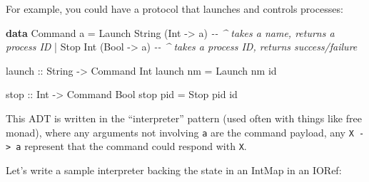 \documentclass[]{article}
\newenvironment{Shaded}{}{}
\newcommand{\CommentTok}[1]{\textcolor[rgb]{0.38,0.63,0.69}{\textit{#1}}}
\newcommand{\DataTypeTok}[1]{\textcolor[rgb]{0.56,0.13,0.00}{#1}}
\newcommand{\FunctionTok}[1]{\textcolor[rgb]{0.02,0.16,0.49}{#1}}
\newcommand{\KeywordTok}[1]{\textcolor[rgb]{0.00,0.44,0.13}{\textbf{#1}}}
\newcommand{\NormalTok}[1]{#1}
\newcommand{\OperatorTok}[1]{\textcolor[rgb]{0.40,0.40,0.40}{#1}}
\newcommand{\OtherTok}[1]{\textcolor[rgb]{0.00,0.44,0.13}{#1}}
\begin{document}
For example, you could have a protocol that launches and controls processes:

\begin{Shaded}
\begin{Highlighting}[]
\KeywordTok{data} \DataTypeTok{Command}\NormalTok{ a }\OtherTok{=}
    \DataTypeTok{Launch} \DataTypeTok{String}\NormalTok{ (}\DataTypeTok{Int} \OtherTok{{-}\textgreater{}}\NormalTok{ a)    }\CommentTok{{-}{-} \^{} takes a name, returns a process ID}
  \OperatorTok{|} \DataTypeTok{Stop} \DataTypeTok{Int}\NormalTok{ (}\DataTypeTok{Bool} \OtherTok{{-}\textgreater{}}\NormalTok{ a)        }\CommentTok{{-}{-} \^{} takes a process ID, returns success/failure}

\OtherTok{launch ::} \DataTypeTok{String} \OtherTok{{-}\textgreater{}} \DataTypeTok{Command} \DataTypeTok{Int}
\NormalTok{launch nm }\OtherTok{=} \DataTypeTok{Launch}\NormalTok{ nm }\FunctionTok{id}

\OtherTok{stop ::} \DataTypeTok{Int} \OtherTok{{-}\textgreater{}} \DataTypeTok{Command} \DataTypeTok{Bool}
\NormalTok{stop pid }\OtherTok{=} \DataTypeTok{Stop}\NormalTok{ pid }\FunctionTok{id}
\end{Highlighting}
\end{Shaded}

This ADT is written in the ``interpreter'' pattern (used often with things like
free monad), where any arguments not involving \texttt{a} are the command
payload, any \texttt{X\ -\textgreater{}\ a} represent that the command could
respond with \texttt{X}.

Let's write a sample interpreter backing the state in an IntMap in an IORef:
\end{document}
